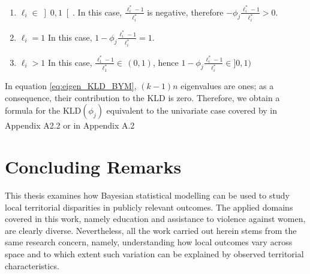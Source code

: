 \documentclass[openany, 11pt, oneside]{book}
\begin{document}
\begin{subappendices}
\begin{enumerate}
\item $\ell_i \in \left]0,1 \right[$. In this case, $\frac{\ell_i^*-1}{\ell_i^*}$ is negative, therefore $-\phi_j \frac{\ell_i^*-1}{\ell_i^*} > 0$.
\item $\ell_i = 1$ In this case, $1-\phi_j \frac{\ell_i^*-1}{\ell_i^*} = 1$.
\item $\ell_i > 1$ In this case, $\frac{\ell_1^*-1}{\ell_1^*} \in \, (0, 1)$, hence $1-\phi_j \frac{\ell_i^*-1}{\ell_i^*}  \in ]0, 1)$
\end{enumerate}
In equation \ref{eq:eigen_KLD_BYM}, $(k-1)n$ eigenvalues are ones; as a consequence, their contribution to the KLD is zero. Therefore, we obtain a formula for the $\mathrm{KLD}(\phi_j)$ equivalent to the univariate case covered by \cite{BYM2} in Appendix A2.2 or \cite{PC} in Appendix A.2

\end{subappendices}


\clearpage
\pagestyle{plain}  

\chapter*{Concluding Remarks}
\thispagestyle{plain}  

This thesis examines how Bayesian statistical modelling can be used to study local territorial disparities in publicly relevant outcomes. The applied domains covered in this work, namely education and assistance to violence against women, are clearly diverse. Nevertheless, all the work carried out herein stems from the same research concern, namely, understanding how local outcomes vary across space and to which extent such variation can be explained by observed territorial characteristics.
\end{document}
